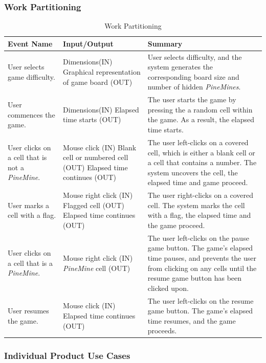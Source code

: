 \documentclass[12pt, titlepage]{article}
\begin{document}
\subsubsection{Work Partitioning}
\begin{table}[H]
	\begin{tabularx}{\textwidth}{|X|X|X|}
\hline
		\textbf{Event Name} & \textbf{Input/Output} & \textbf{Summary} \\ 
		\hline
			User selects game difficulty. &
			Dimensions(IN)
			Graphical representation of game board (OUT) & 
			User selects difficulty, and the system generates the corresponding board size and number of hidden
			\textit{PineMines}. \\
		\hline
			User commences the game. &
			Dimensions(IN)
			Elapsed time starts (OUT) & 
			The user starts the game by pressing the a random cell within the game. As a result, the elapsed time starts. \\
		\hline
			User clicks on a cell that is not a \textit{PineMine}. &
			Mouse click (IN)
			Blank cell or numbered cell (OUT)
			Elapsed time continues (OUT) & 
			The user left-clicks on a covered cell, which is either a blank cell or a cell that contains a number. 
			The system uncovers the cell, the elapsed time and game proceed. \\
		\hline
			User marks a cell with a flag. &
			Mouse right click (IN)
			Flagged cell (OUT)
			Elapsed time continues (OUT) &
			The user right-clicks on a covered cell. The system marks the cell with a flag, the elapsed time 
			and the game proceed. \\
		\hline
			User clicks on a cell that is a \textit{PineMine}. &		
			Mouse right click (IN)
			\textit{PineMine} cell (OUT) &
			The user left-clicks on the pause game button. The game's elapsed time pauses, and 
			prevents the user from clicking on any cells until the resume game button has been clicked upon. \\
		\hline
			User resumes the game. &
			Mouse click (IN)
			Elapsed time continues (OUT) &
			The user left-clicks on the resume game button. The game's elapsed time resumes, and the game proceeds. \\
		\hline
	\end{tabularx}
		\caption{Work Partitioning}
		\label{Table}
\end{table}

\subsubsection{Individual Product Use Cases}
\end{document}
